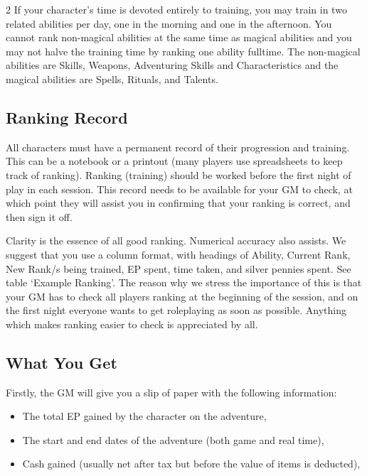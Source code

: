 \begin{multicols}{2}
If your character’s time is devoted entirely to training, you may
train in two related abilities per day, one in the morning and one in
the afternoon. You cannot rank non-magical abilities at the same time
as magical abilities and you may not halve the training time by
ranking one ability fulltime. The non-magical abilities are Skills,
Weapons, Adventuring Skills and Characteristics and the magical
abilities are Spells, Rituals, and Talents.

\subsection{Ranking Record}

All characters must have a permanent record of their progression and
training. This can be a notebook or a printout (many players use
spreadsheets to keep track of ranking).  Ranking (training) should be
worked before the first night of play in each session. This record
needs to be available for your GM to check, at which point they will
assist you in confirming that your ranking is correct, and then sign
it off.

Clarity is the essence of all good ranking.  Numerical accuracy also
assists. We suggest that you use a column format, with headings of
Ability, Current Rank, New Rank/s being trained, EP spent, time taken,
and silver pennies spent. See table ‘Example Ranking’.  The reason why
we stress the importance of this is that your GM has to check all
players ranking at the beginning of the session, and on the first
night everyone wants to get roleplaying as soon as possible. Anything
which makes ranking easier to check is appreciated by all.

\subsection{What You Get}

Firstly, the GM will give you a slip of paper with the following
information:

\begin{itemize}

\item The total EP gained by the character on the adventure,
\item The start and end dates of the
adventure (both game and real time),

\item Cash gained (usually net after tax but before the value of items
  is deducted),


\end{itemize}
\end{multicols}
